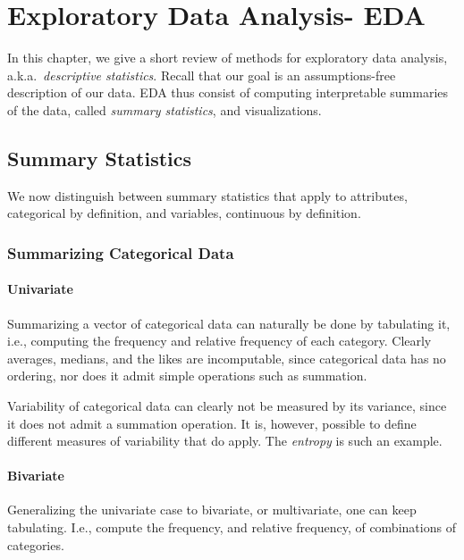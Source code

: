 \chapter{Exploratory Data Analysis- EDA}
\label{sec:exploratory}


In this chapter, we give a short review of methods for exploratory data analysis, a.k.a.\ \emph{descriptive statistics}.
Recall that our goal is an assumptions-free description of our data. 
EDA thus consist of computing interpretable summaries of the data, called \emph{summary statistics}, and visualizations. 


\section{Summary Statistics}
\label{sec:summary_statistics}

We now distinguish between summary statistics that apply to attributes, categorical by definition, and variables, continuous by definition. 


\subsection{Summarizing Categorical Data}

\subsubsection{Univariate}
Summarizing a vector of categorical data can naturally be done by tabulating it, i.e., computing the frequency and relative frequency of each category.
Clearly averages, medians, and the likes are incomputable, since categorical data has no ordering, nor does it admit simple operations such as summation.

\begin{extra}
Variability of categorical data can clearly not be measured by its variance, since it does not admit a summation operation.
It is, however, possible to define different measures of variability that do apply.
The \emph{entropy} is such an example.
\end{extra}


\subsubsection{Bivariate}
Generalizing the univariate case to bivariate, or multivariate, one can keep tabulating. I.e., compute the frequency, and relative frequency, of combinations of categories.



